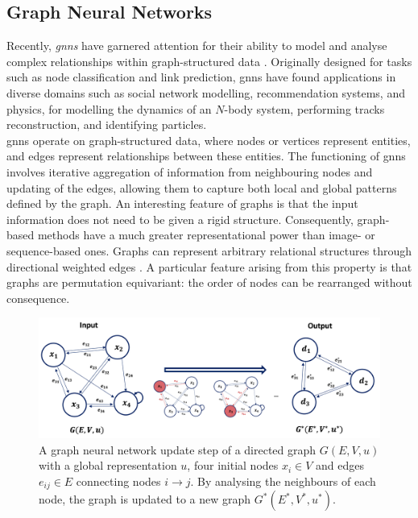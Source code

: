 \subsection{Graph Neural Networks}\label{chapter-GNN}
Recently, \textit{\glspl{gnn}} have garnered attention for their ability to model and analyse complex relationships within graph-structured data \cite{graphNetRef}. Originally designed for tasks such as node classification and link prediction, \glspl{gnn} have found applications in diverse domains such as social network modelling, recommendation systems, and physics, for modelling the dynamics of an $N$-body system, performing tracks reconstruction, and identifying particles. \\

\glspl{gnn} operate on graph-structured data, where nodes or vertices represent entities, and edges represent relationships between these entities. The functioning of \glspl{gnn} involves iterative aggregation of information from neighbouring nodes and updating of the edges, allowing them to capture both local and global patterns defined by the graph. An interesting feature of graphs is that the input information does not need to be given a rigid structure. Consequently, graph-based methods have a much greater representational power than image- or sequence-based ones. Graphs can represent arbitrary relational structures through directional weighted edges \cite{graphInductiveBias}. A particular feature arising from this property is that graphs are permutation equivariant: the order of nodes can be rearranged without consequence. \\

\begin{figure}[h!]
    \center
    \includegraphics[width=\textwidth]{Images/ML/gnn.png}
    \caption{A graph neural network update step of a directed graph $G(E, V, u)$ with a global representation $u$, four initial nodes $x_i \in V$ and edges $e_{ij} \in E$ connecting nodes $i \rightarrow j$. By analysing the neighbours of each node, the graph is updated to a new graph $G^*(E^*, V^*, u^*)$.} %
    \label{fig:gnnScheme}
\end{figure}

